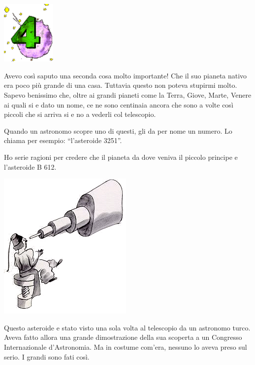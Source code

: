 \documentclass[11pt]{scrbook}
\begin{document}
\chapter{}
\begin{center}
\includegraphics{img/chapter4}
\end{center}

Avevo così saputo una seconda cosa molto importante! Che il suo pianeta
nativo era poco più grande di una casa. Tuttavia questo non poteva
stupirmi molto. Sapevo benissimo che, oltre ai grandi pianeti come la
Terra, Giove, Marte, Venere ai quali si e dato un nome, ce ne sono
centinaia ancora che sono a volte così piccoli che si arriva si e no a
vederli col telescopio.

Quando un astronomo scopre uno di questi, gli da per nome un numero. Lo
chiama per esempio: ``l'asteroide 3251''.

Ho serie ragioni per credere che il pianeta da dove veniva il piccolo
principe e l'asteroide B 612.

\begin{center}
\includegraphics{img/4b}

\end{center}

Questo asteroide e stato visto una sola volta al telescopio da un
astronomo turco. Aveva fatto allora una grande dimostrazione della sua
scoperta a un Congresso Internazionale d'Astronomia. Ma in costume
com'era, nessuno lo aveva preso sul serio. I grandi sono fati così.
\end{document}
